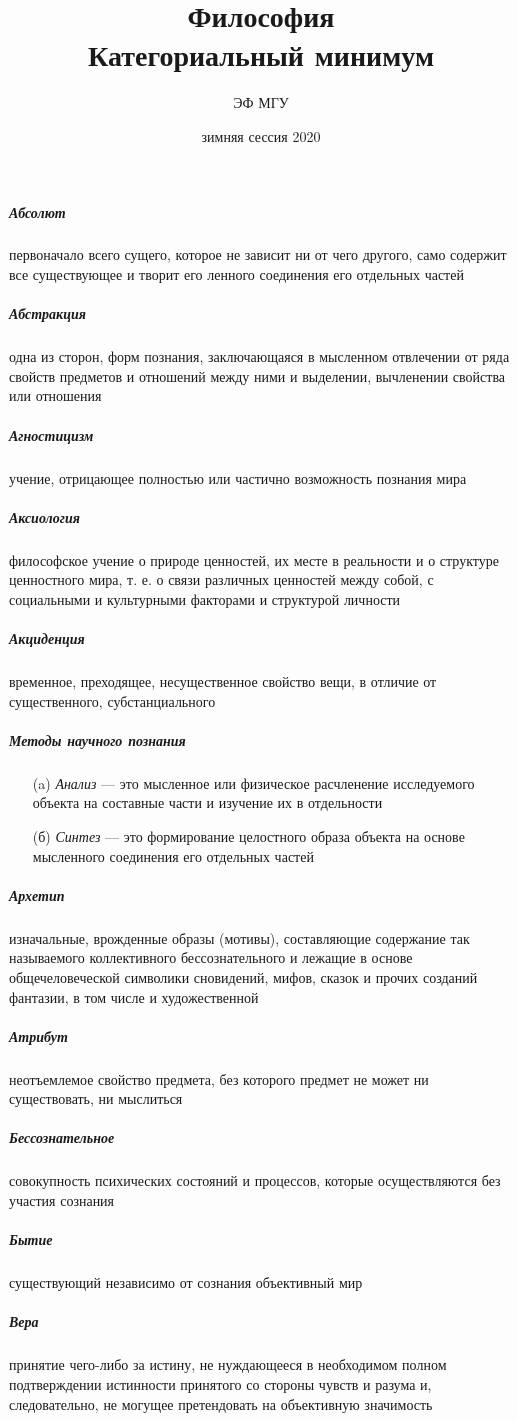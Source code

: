 \documentclass[a4paper, 12pt]{article}
\title{Философия \\ Категориальный минимум}
\author{ЭФ МГУ}
\date{зимняя сессия 2020}
\theoremstyle{plain} %
\theoremstyle{definition} %
\theoremstyle{remark} %
\begin{document}
\maketitle

\subparagraph{Абсолют}
    первоначало всего сущего, которое не зависит ни от чего другого, само содержит все существующее и творит его ленного соединения его отдельных частей

\subparagraph{Абстракция}
    одна из сторон, форм познания, заключающаяся в мысленном отвлечении от ряда свойств предметов и отношений между ними и выделении, вычленении свойства или отношения

\subparagraph{Агностицизм}
    учение, отрицающее полностью или частично возможность познания мира

\subparagraph{Аксиология}
    философское учение о природе ценностей, их месте в реальности и о структуре ценностного мира, т. е. о связи различных ценностей между собой, с социальными и культурными факторами и структурой личности

\subparagraph{Акциденция}
    временное, преходящее, несущественное свойство вещи, в отличие от существенного, субстанциального

\subparagraph{Методы научного познания}
    \begin{itemize}
        \item[(a)] \emph{Анализ} --- это мысленное или физическое расчленение исследуемого объекта на составные части и изучение их в отдельности
         \item[(б)] \emph{Синтез} --- это формирование целостного образа объекта на основе мысленного соединения его отдельных частей
    \end{itemize}

\subparagraph{Архетип}
    изначальные, врожденные образы (мотивы), составляющие содержание так называемого коллективного бессознательного и лежащие в основе общечеловеческой символики сновидений, мифов, сказок и прочих созданий фантазии, в том числе и художественной

\subparagraph{Атрибут}
    неотъемлемое свойство предмета, без которого предмет не может ни существовать, ни мыслиться

\subparagraph{Бессознательное}
    совокупность психических состояний и процессов, которые осуществляются без участия сознания

\subparagraph{Бытие}
    существующий независимо от сознания объективный мир

\subparagraph{Вера}
    принятие чего-либо за истину, не нуждающееся в необходимом полном подтверждении истинности принятого со стороны чувств и разума и, следовательно, не могущее претендовать на объективную значимость
\end{document}
